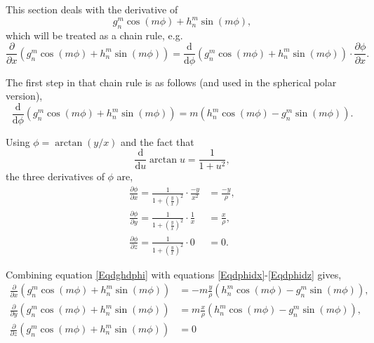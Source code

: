 \documentclass[]{article}
\begin{document}
			This section deals with the derivative of 
			\begin{equation}
				g_n^m \cos{(m\phi)} + h_n^m\sin{(m\phi)},
			\end{equation}	
			which will be treated as a chain rule, e.g.
			\begin{equation}
				\frac{\partial}{\partial x}\left(g_n^m \cos{(m\phi)} + h_n^m\sin{(m\phi)}\right) = \frac{\text{d}}{\text{d}\phi}\left(g_n^m \cos{(m\phi)} + h_n^m\sin{(m\phi)}\right)\cdot\frac{\partial\phi}{\partial x}.
			\end{equation}
			
			The first step in that chain rule is as follows (and used in the spherical polar version),
			\begin{equation}
				\frac{\text{d}}{\text{d}\phi}\left(g_n^m \cos{(m\phi)} + h_n^m\sin{(m\phi)}\right) = m\left( h_n^m \cos{(m\phi)} - g_n^m \sin{(m\phi)}\right). \label{Eqdghdphi}
			\end{equation}
			
			Using $\phi = \arctan{(y/x)}$ and the fact that
			\begin{equation}
				\frac{\text{d}}{\text{d} u} \arctan{u} = \frac{1}{1 + u^2},
			\end{equation}
			the three derivatives of $\phi$ are,
			\begin{align}
				\frac{\partial \phi}{\partial x} = \frac{1}{1 + \left(\frac{y}{x}\right)^2}\cdot\frac{-y}{x^2} &= \frac{-y}{\rho}, \label{Eqdphidx} \\
				\frac{\partial \phi}{\partial y} = \frac{1}{1 + \left(\frac{y}{x}\right)^2}\cdot\frac{1}{x} &= \frac{x}{\rho},\label{Eqdphidy} \\ 
				\frac{\partial \phi}{\partial z} = \frac{1}{1 + \left(\frac{y}{x}\right)^2}\cdot 0 &= 0. \label{Eqdphidz}
			\end{align}
			
			Combining equation \ref{Eqdghdphi} with equations \ref{Eqdphidx}-\ref{Eqdphidz} gives,
			\begin{align}
				\frac{\partial}{\partial x}\left(g_n^m \cos{(m\phi)} + h_n^m\sin{(m\phi)}\right) &= -m\frac{y}{\rho}\left( h_n^m \cos{(m\phi)} - g_n^m \sin{(m\phi)}\right), \\
				\frac{\partial}{\partial y}\left(g_n^m \cos{(m\phi)} + h_n^m\sin{(m\phi)}\right) &= m\frac{x}{\rho}\left( h_n^m \cos{(m\phi)} - g_n^m \sin{(m\phi)}\right), \\
				\frac{\partial}{\partial z}\left(g_n^m \cos{(m\phi)} + h_n^m\sin{(m\phi)}\right) &= 0
			\end{align}
		
\end{document}
